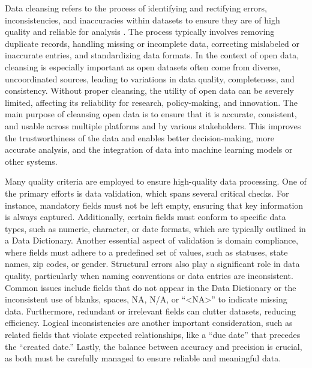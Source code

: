 \documentclass[linenumber]{jdsart}
\begin{document}
Data cleansing refers to the process of identifying and rectifying
errors, inconsistencies, and inaccuracies within datasets to ensure
they are of high quality and reliable for analysis
\citep{maletic2005data, hosseinzadeh2023data}. The process
typically involves removing duplicate records, handling missing or
incomplete data, correcting mislabeled or inaccurate entries, and
standardizing data formats. In the context of open data, cleansing is
especially important as open datasets often come from diverse,
uncoordinated sources, leading to variations in data quality,
completeness, and consistency. Without proper cleansing, the utility
of open data can be severely limited, affecting its reliability for
research, policy-making, and innovation. The main purpose of cleansing
open data is to ensure that it is accurate, consistent, and usable
across multiple platforms and by various stakeholders. This improves
the trustworthiness of the data and enables better decision-making,
more accurate analysis, and the integration of data into machine
learning models or other systems.





Many quality criteria are employed to ensure high-quality data 
processing. One of the primary efforts is data validation, which spans 
several critical checks. For instance, mandatory fields must not be 
left empty, ensuring that key information is always captured. 
Additionally, certain fields must conform to specific data types, 
such as numeric, character, or date formats, which are typically 
outlined in a Data Dictionary. Another essential aspect of validation 
is domain compliance, where fields must adhere to a predefined set of 
values, such as statuses, state names, zip codes, or gender. Structural 
errors also play a significant role in data quality, particularly when 
naming conventions or data entries are inconsistent. Common issues 
include fields that do not appear in the Data Dictionary or the 
inconsistent use of blanks, spaces, NA, N/A, or ``<NA>'' to indicate 
missing data. Furthermore, redundant or irrelevant fields can clutter 
datasets, reducing efficiency. Logical inconsistencies are another 
important consideration, such as related fields that violate expected 
relationships, like a ``due date'' that precedes the ``created date.'' 
Lastly, the balance between accuracy and precision is crucial, as both 
must be carefully managed to ensure reliable and meaningful data.
\end{document}

